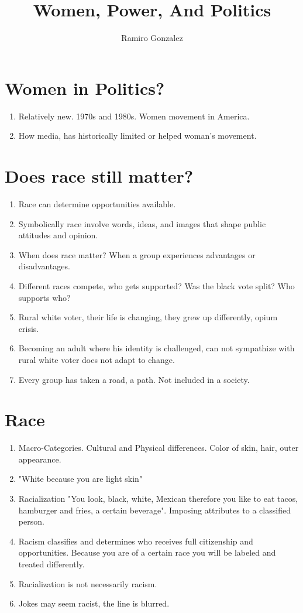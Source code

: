 \documentclass{article}
\title{Women, Power, And Politics}
\author{Ramiro Gonzalez }
\date{}
\begin{document}
\maketitle
\section*{Women in Politics?}
\begin{enumerate}
    \item Relatively new. 1970s and 1980s. Women movement in America. 
    \item How media, has historically limited or helped woman's movement. 
\end{enumerate}
\section*{Does race still matter?}
\begin{enumerate}
    \item Race can determine opportunities available. 
    \item Symbolically race involve words, ideas, and images that shape public attitudes and opinion. 
    \item When does race matter? When a group experiences advantages or disadvantages. 
    \item Different races compete, who gets supported? Was the black vote split? Who supports who? 
    \item Rural white voter, their life is changing, they grew up differently, opium crisis. 
    \item Becoming an adult where his identity is challenged, can not sympathize with rural white voter does not adapt to change. 
    \item Every group has taken a road, a path. Not included in a society. 
\end{enumerate}
\section*{Race}
\begin{enumerate}
    \item Macro-Categories. Cultural and Physical differences. Color of skin, hair, outer appearance. 
    \item "White because you are light skin"
    \item Racialization "You look, black, white, Mexican therefore you like to eat tacos, hamburger and fries, a certain beverage". Imposing attributes to a classified person. 
    \item Racism classifies and determines who receives full citizenship and opportunities. Because you are of a certain race you will be labeled and treated differently. 
    \item Racialization is not necessarily racism. 
    \item Jokes may seem racist, the line is blurred. 
\end{enumerate}
\end{document}
